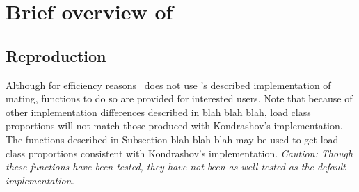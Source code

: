 \newcommand{\Ffemale}{\mbox{$F_{fem}$}}
\newcommand{\Fmale}{\mbox{$F_{male}$}}
\newcommand{\betaij}{\mbox{$\beta_{i,j}$}}
\newcommand{\gammaij}{\mbox{$\gamma_{i,j}$}}
\newcommand{\alphaij}{\mbox{$\alpha_{i,j}$}}
\newcommand{\rhoij}{\mbox{$\rho_{i,j}$}}

\newcommand{\betanv}{\mbox{$\beta_{n,v}$}}
\newcommand{\gammanv}{\mbox{$\gamma_{n,v}$}}
\newcommand{\alphanv}{\mbox{$\alpha_{n,v}$}}
\newcommand{\rhollam}{\mbox{$\rho_{l,\lambda}$}}

\newcommand{\SOijg}{\mbox{$SO_{i,j}(g)$}}
\newcommand{\AOijg}{\mbox{$AO_{i,j}(g)$}}
\newcommand{\OOijg}{\mbox{$OO_{i,j}(g)$}}
\newcommand{\OPijg}{\mbox{$OP_{i,j}(g)$}}

\newcommand{\SOnvx}{\mbox{$SO_{n,v}(\xi)$}}
\newcommand{\AOnvx}{\mbox{$AO_{n,v}(\xi)$}}
\newcommand{\OOnvx}{\mbox{$OO_{n,v}(\xi)$}}
\newcommand{\OPllamz}{\mbox{$OP_{l,\lambda}(\zeta)$}}

\newcommand{\funcself}{\mbox{$s_{i,j}(n,v)$}}
\newcommand{\funcapomixis}{\mbox{$a_{i,j}(n,v)$}}
\newcommand{\funcoutcross}{\mbox{$o_{i,j}(n,v,l,\lambda)$}}

\newcommand{\funcselfnested}{\mbox{$s_{i_0\/,j_0\/,i_1\/,j_1\/}(n_0\/,v_0\/,n_1\/,v_1\/)$}}
\newcommand{\funcapomixisnested}{\mbox{$a_{i_0\/,j_0\/,i_1\/,j_1\/}(n_0\/,v_0\/,n_1\/,v_1\/)$}}
\newcommand{\funcoutcrossnested}{\mbox{$o_{i_0\/,j_0\/,i_1\/,j_1\/}(n_0\/,v_0\/,l_0,\lambda_0,n_1\/,v_1\/,l_1,\lambda_1)$}}

\newcommand{\TSgx}{\mbox{${\cal T}_{S}(\xi,g)$}}
\newcommand{\TAgx}{\mbox{${\cal T}_{A}(\xi,g)$}}
\newcommand{\TOgxz}{\mbox{${\cal T}_{O}(\xi,\zeta,g)$}}

\section{Brief overview of }

\subsection{Reproduction}
Although for efficiency reasons \K\ does not use \citeauthor{Kondrashov:1985:5375}'s \citeyearpar{Kondrashov:1985:5375} described implementation of mating, functions to do so are provided for interested users.  Note that because of other implementation differences described in blah blah blah, load class proportions will not match those produced with Kondrashov's implementation.  The functions described in Subsection blah blah blah may be used to get load class proportions consistent with Kondrashov's implementation.  {\em Caution: Though these functions have been tested, they have not been as well tested as the default implementation.}

